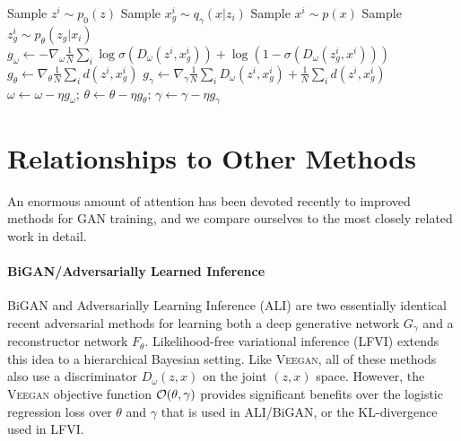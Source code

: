\documentclass{article}
\newcommand{\lr}{\mbox{\tiny\textsc{lr}}}
\newcommand{\acronym}{\textsc{Veegan}\xspace}
\begin{document}
\begin{algorithm}[tb]
\caption{\acronym training\label{alg:veegan}}
\begin{algorithmic}[1]
\State Sample $z^i \sim p_0(z)$ 
\State Sample $x_g^i \sim q_\gamma(x|z_i)$ 
\State Sample $x^i \sim p(x)$ 
\State Sample $z_g^i \sim p_\theta(z_g|x_i)$ 
\EndFor
\State $g_\omega \gets - \nabla_\omega \frac{1}{N}\sum_i \log \sigma \left(D_\omega(z^i,x_g^i)\right) + \log\left( 1-\sigma \left(D_\omega(z_g^i,x^i)\right)\right) $
\Comment{Compute $\nabla_\omega \hat{\calO}_{\lr}$ }
\State
\State $g_\theta \gets  \nabla_\theta \frac{1}{N}\sum_i d(z^i, x_g^i)$
\State
\State $g_\gamma \gets \nabla_\gamma \frac{1}{N}\sum_i D_\omega(z^i,x_g^i) +  \frac{1}{N}\sum_i d(z^i, x_g^i)$
\State
\State $\omega \gets \omega - \eta g_\omega$; $\theta \gets \theta - \eta g_\theta$; $\gamma \gets \gamma - \eta g_\gamma$
\EndWhile
\end{algorithmic}
\end{algorithm}


\section{Relationships to Other Methods}

An enormous amount of attention has been devoted recently
to improved methods for GAN training,
and we compare ourselves to the most closely related work in detail.

\paragraph{BiGAN/Adversarially Learned Inference}
BiGAN \citep{donahue2016adversarial} and Adversarially Learning Inference (ALI) \citep{ali2016}
are two essentially identical recent adversarial methods for learning both a deep generative network
$G_\gamma$ and a reconstructor network $F_\theta$. 
Likelihood-free variational inference (LFVI) \citep{tran17dim} extends this
idea to a hierarchical Bayesian setting. Like \acronym,
all of these methods also
use
a discriminator $D_\omega(z,x)$ on the joint $(z,x)$ space.  However, the \acronym objective function $\mathcal{O}(\theta, \gamma)$
provides significant benefits over
the logistic regression loss over $\theta$ and $\gamma$ that is used in ALI/BiGAN, or the KL-divergence used in LFVI.
\end{document}
